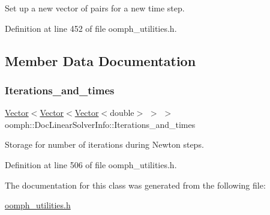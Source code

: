 Set up a new vector of pairs for a new time step. 



Definition at line 452 of file oomph\+\_\+utilities.\+h.



\subsection{Member Data Documentation}
\mbox{\label{classoomph_1_1DocLinearSolverInfo_a39f9368b84a0247ec2aec6dd0b759c52}} 
\subsubsection{\texorpdfstring{Iterations\+\_\+and\+\_\+times}{Iterations\_and\_times}}
{\footnotesize\ttfamily \hyperlink{classoomph_1_1Vector}{Vector}$<$\hyperlink{classoomph_1_1Vector}{Vector}$<$\hyperlink{classoomph_1_1Vector}{Vector}$<$double$>$ $>$ $>$ oomph\+::\+Doc\+Linear\+Solver\+Info\+::\+Iterations\+\_\+and\+\_\+times\hspace{0.3cm}{\ttfamily [private]}}



Storage for number of iterations during Newton steps. 



Definition at line 506 of file oomph\+\_\+utilities.\+h.



The documentation for this class was generated from the following file\+:\begin{DoxyCompactItemize}
\item 
\hyperlink{oomph__utilities_8h}{oomph\+\_\+utilities.\+h}\end{DoxyCompactItemize}
